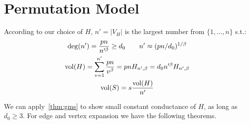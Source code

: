 \section{Permutation Model}

According to our choice of $H$, $n'=|V_H|$ is the largest number from $\{1,\ldots,n\}$ s.t.:
\begin{gather}
    \deg(n')=\frac{pn}{n'^\beta}\geq d_0
    \qquad n'\approx(pn/d_0)^{1/\beta}\\
    \operatorname*{vol}(H)=\sum_{v=1}^{n'}{\frac{pn}{v^\beta}}=pnH_{n',\beta}=d_0n'^\beta H_{n',\beta}\\
    \operatorname*{vol}(S)=s\frac{\operatorname*{vol}(H)}{n'}
\end{gather}

We can apply~\autoref{thm:gms} to show small constant conductance of $H$,
as long as $d_0\geq 3$. For edge and vertex expansion we have the following theorems.


